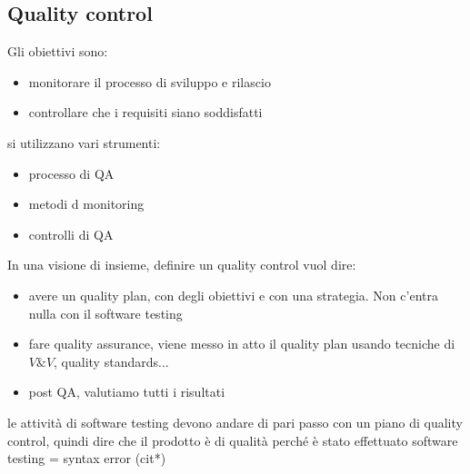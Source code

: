 \documentclass{article}
\begin{document}
\subsection{Quality control}
Gli obiettivi sono:
\begin{itemize}
\item monitorare il processo di sviluppo e rilascio
\item controllare che i requisiti siano soddisfatti
\end{itemize}
si utilizzano vari strumenti:
\begin{itemize}
\item processo di QA
\item metodi d monitoring
\item controlli di QA
\end{itemize}
In una visione di insieme, definire un quality control vuol dire:
\begin{itemize}
\item avere un quality plan, con degli obiettivi e con una strategia. Non c'entra nulla con il software testing
\item fare quality assurance, viene messo in atto il quality plan usando tecniche di $V\&V$, quality standards...
\item post QA, valutiamo tutti i risultati
\end{itemize}
le attività di software testing devono andare di pari passo con un piano di quality control, quindi dire che il prodotto è di qualità perché è stato effettuato software testing = syntax error (cit*)
\end{document}
